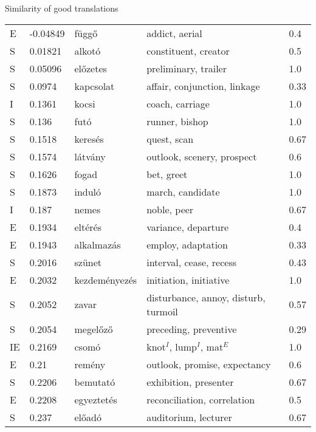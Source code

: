 \documentclass[10pt]{beamer}%
\newcommand{\e}{$^E$}
\newcommand{\id}{$^I$}
\begin{document}
  \begin{frame} [allowframebreaks] {Similarity of good translations}
    \small
    \begin{longtable}{lllll}
      \toprule
        E	& -0.04849	& függő	& addict, aerial	& 0.4 \\
        S	& 0.01821	& alkotó	& constituent, creator	& 0.5 \\
        S	& 0.05096	& előzetes	& preliminary, trailer	& 1.0 \\
        S	& 0.0974	& kapcsolat	& affair, conjunction, linkage	& 0.33 \\
        I	& 0.1361	& kocsi	& coach, carriage	& 1.0 \\
        S	& 0.136	& futó	& runner, bishop	& 1.0 \\
        S	& 0.1518	& keresés	& quest, scan	& 0.67 \\
        S	& 0.1574	& látvány	& outlook, scenery, prospect	& 0.6 \\
        S	& 0.1626	& fogad	& bet, greet	& 1.0 \\
        S	& 0.1873	& induló	& march, candidate	& 1.0 \\
        I	& 0.187	& nemes	& noble, peer	& 0.67 \\
        E	& 0.1934	& eltérés	& variance, departure	& 0.4 \\
        E	& 0.1943	& alkalmazás	& employ, adaptation	& 0.33 \\
        S	& 0.2016	& szünet	& interval, cease, recess	& 0.43 \\
        E	& 0.2032	& kezdeményezés	& initiation, initiative	& 1.0 \\
        S	& 0.2052	& zavar	& disturbance, annoy, disturb, turmoil	& 0.57 \\
        S	& 0.2054	& megelőző	& preceding, preventive	& 0.29 \\
        IE& 0.2169	& csomó	& knot\id, lump\id, mat\e	& 1.0  \\
        E\footnotemark
        & 0.21	& remény	& outlook, promise, expectancy	& 0.6	  \\
        S	& 0.2206	& bemutató	& exhibition, presenter	& 0.67 \\
        E	& 0.2208	& egyeztetés	& reconciliation, correlation	& 0.5 \\
        S	& 0.237	& előadó	& auditorium, lecturer	& 0.67 \\

\end{longtable}
\end{frame}
\end{document}
